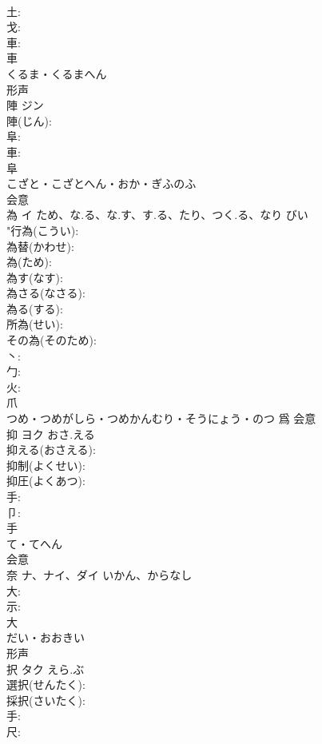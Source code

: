 \documentclass[8pt]{extreport}
\begin{document}
\begin{CJK}{UTF8}{min}
\\	土: 
\\	戈: 
\\	車: 
\\	車	
\\	くるま・くるまへん	
\\	形声 
\\	陣	ジン			
\\	陣(じん): 
\\	阜: 
\\	車: 
\\	阜	
\\	こざと・こざとへん・おか・ぎふのふ	
\\	会意 
\\	為	イ	ため、な.る、な.す、す.る、たり、つく.る、なり	びい	
\\	"行為(こうい): 
\\	為替(かわせ): 
\\	為(ため): 
\\	為す(なす): 
\\	為さる(なさる): 
\\	為る(する): 
\\	所為(せい): 
\\	その為(そのため): 
\\	丶: 
\\	勹: 
\\	火: 
\\	爪	
\\	つめ・つめがしら・つめかんむり・そうにょう・のつ	爲	会意 
\\	抑	ヨク	おさ.える		
\\	抑える(おさえる): 
\\	抑制(よくせい): 
\\	抑圧(よくあつ): 
\\	手: 
\\	卩: 
\\	手	
\\	て・てへん	
\\	会意 
\\	奈	ナ、ナイ、ダイ	いかん、からなし		
\\	大: 
\\	示: 
\\	大	
\\	だい・おおきい	
\\	形声 
\\	択	タク	えら.ぶ		
\\	選択(せんたく): 
\\	採択(さいたく): 
\\	手: 
\\	尺: 

\end{CJK}
\end{document}
